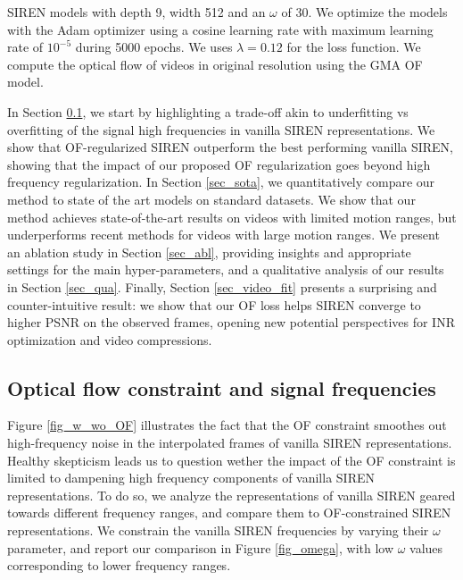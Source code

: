 \documentclass{article}
\begin{document}
SIREN models with depth 9, width 512 and an $\omega$ of 30.
We optimize the models with the Adam optimizer using a cosine learning rate with maximum learning rate of $10^{-5}$ during 5000 epochs.
We uses $\lambda = 0.12$ for the loss function. We compute the optical flow of videos in original resolution using the GMA \cite{jiang2021learning} OF model.

In Section \ref{sec_of_high}, we start by highlighting a trade-off akin to
underfitting vs overfitting of the signal high frequencies in vanilla SIREN representations.
We show that OF-regularized SIREN outperform the best performing vanilla SIREN,
showing that the impact of our proposed OF regularization goes beyond high frequency regularization.
In Section \ref{sec_sota}, we quantitatively compare our method to state of the art models on standard datasets.
We show that our method achieves state-of-the-art results on videos with limited motion ranges,
but underperforms recent methods for videos with large motion ranges.
We present an ablation study in Section \ref{sec_abl},
providing insights and appropriate settings for the main hyper-parameters,
and a qualitative analysis of our results in Section \ref{sec_qua}.
Finally, Section \ref{sec_video_fit} presents a surprising and counter-intuitive result:
we show that our OF loss helps SIREN converge to higher PSNR on the observed frames,
opening new potential perspectives for INR optimization and video compressions.

\subsection{Optical flow constraint and signal frequencies}
\label{sec_of_high}
Figure \ref{fig_w_wo_OF} illustrates the fact that the OF constraint smoothes
out high-frequency noise in the interpolated frames of vanilla SIREN representations.
Healthy skepticism leads us to question wether the impact of the OF constraint is limited to dampening
high frequency components of vanilla SIREN representations.
To do so, we analyze the representations of vanilla SIREN geared towards different frequency ranges,
and compare them to OF-constrained SIREN representations.
We constrain the vanilla SIREN frequencies by varying their $\omega$ parameter,
and report our comparison in Figure \ref{fig_omega},
with low $\omega$ values corresponding to lower frequency ranges.
\end{document}
